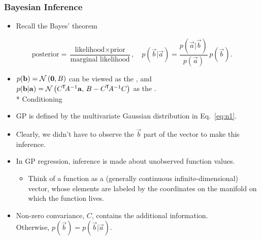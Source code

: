 \begin{frame} \frametitle{Bayesian Inference}
\vspace{-2mm}
\begin{itemize}
  \item Recall the Bayes' theorem
\end{itemize}
\vspace{1mm}
\begin{equation}
  \text{posterior} =
  \frac{\text{likelihood}\times\text{prior}}{\text{marginal likelihood}},
  \quad
  p(\vec{b}|\vec{a}) = \frac{p(\vec{a}|\vec{b})}{p(\vec{a})}\,p(\vec{b}).
\end{equation}
\begin{itemize}
  \item $p(\mathbf{b}) = \mathcal{N}\left(\mathbf{0},B\right)$ can be viewed as the ,
    and $p(\mathbf{b}|\mathbf{a}) = \mathcal{N}\left(C^{\mkern-1.5mu\mathsf{T}}\!A^{-1}\mathbf{a},\,B-C^{\mkern-1.5mu\mathsf{T}}\!A^{-1}C\right)$ as the
    . \\
    {\small\color{gray} * Conditioning}
  \vspace{1mm}
  \item GP is defined by the multivariate Gaussian distribution in
    Eq.~\ref{eq:n1}.
  \vspace{1mm}
  \item Clearly, we didn't have to observe the $\vec{b}$ part of the
    vector to make this inference.
  \vspace{1mm}
  \item In GP regression, inference is made about unobserved function values.
  \begin{itemize}
    \item Think of a function as a (generally continuous infinite-dimensional)
      vector, whose elements are labeled by the coordinates on the manifold
      on which the function lives.
  \end{itemize}
  \vspace{1mm}
  \item Non-zero convariance, $C$, contains the additional information. \\
    Otherwise, $p(\vec{b}) = p(\vec{b}|\vec{a})$.
\end{itemize}
\end{frame}

